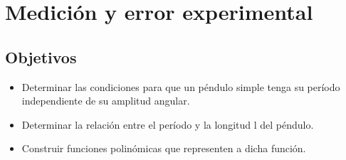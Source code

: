 \section{Medición y error experimental}

\subsection{Objetivos}
\begin{itemize}
    \item Determinar las condiciones para que un péndulo simple tenga su período independiente de su amplitud angular.
    \item Determinar la relación entre el período y la longitud l del péndulo.
    \item Construir funciones polinómicas que representen a dicha función.
\end{itemize}
